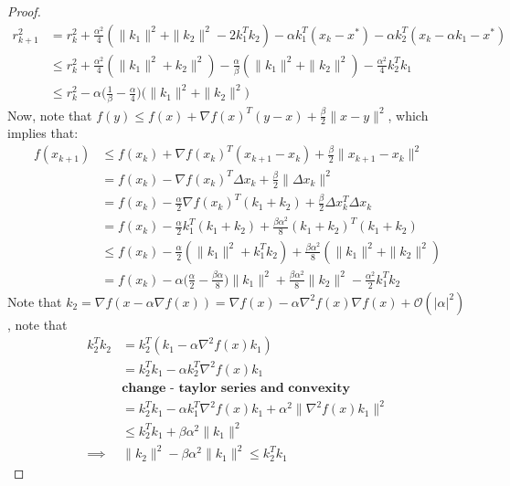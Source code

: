 \begin{proof}
\begin{equation}
\begin{aligned}
r_{k+1}^2 &= r_k^2 + \frac{\alpha^2}{4}(\|k_1\|^2 + \|k_2\|^2 - 2k_1^T k_2) - \alpha k_1^T (x_k - x^*) - \alpha k_2^T (x_k - \alpha k_1 - x^*) \\
&\leq r_k^2 + \frac{\alpha^2}{4}(\| k_1\|^2 + k_2 \|^2) - \frac{\alpha}{\beta}(\|k_1\|^2 + \|k_2\|^2) - \frac{\alpha^2}{4}k_2^T k_1 \\
&\leq r_k^2 - \alpha \big(\frac{1}{\beta} - \frac{\alpha}{4}\big) \big( \|k_1\|^2 + \|k_2\|^2 \big)
\end{aligned}
\end{equation}
Now, note that $f(y) \leq f(x) + \nabla f(x)^T(y-x) + \frac{\beta}{2}\|x-y\|^2$, which implies that:
\begin{equation}
\begin{aligned}
f(x_{k+1}) &\leq f(x_k) + \nabla f(x_k)^T (x_{k+1} - x_k) + \frac{\beta}{2}\|x_{k+1} - x_k \|^2 \\
&= f(x_k) - \nabla f(x_k)^T \Delta x_k + \frac{\beta}{2}\| \Delta x_k \|^2 \\
&= f(x_k) - \frac{\alpha}{2}\nabla f(x_k)^T (k_1 + k_2) + \frac{\beta}{2}\Delta x_k^T \Delta x_k \\
&= f(x_k) - \frac{\alpha}{2}k_1^T(k_1 + k_2) + \frac{\beta \alpha^2}{8}(k_1 + k_2)^T(k_1 + k_2) \\
& \leq  f(x_k) - \frac{\alpha}{2}(\|k_1\|^2 + k_1^T k_2) + \frac{\beta \alpha^2}{8}(\|k_1\|^2 + \|k_2\|^2) \\
&= f(x_k) - \alpha \big(\frac{\alpha}{2} - \frac{\beta \alpha}{8}\big)\|k_1\|^2 + \frac{\beta \alpha^2}{8}\|k_2\|^2 - \frac{\alpha^2}{2} k_1^T k_2
\end{aligned}
\end{equation}
Note that $k_2 = \nabla f(x - \alpha \nabla f(x)) = \nabla f(x) - \alpha \nabla^2 f(x) \nabla f(x) + \mathcal{O}(|\alpha|^2)$, note that
\begin{equation}
\begin{aligned}
k_2^T k_2 &= k_2^T(k_1 - \alpha \nabla^2 f(x) k_1) \\
&= k_2^T k_1 - \alpha k_2^T \nabla^2 f(x) k_1 \\
& \textbf{change - taylor series and convexity} \\
&= k_2^T k_1 - \alpha k_1^T \nabla^2 f(x) k_1 + \alpha^2 \|\nabla^2 f(x) k_1\|^2 \\
& \leq k_2^T k_1 + \beta \alpha^2 \|k_1\|^2 \\
\implies & \|k_2\|^2 - \beta \alpha^2 \|k_1\|^2 \leq k_2^T k_1
\end{aligned}
\end{equation}


\end{proof}

